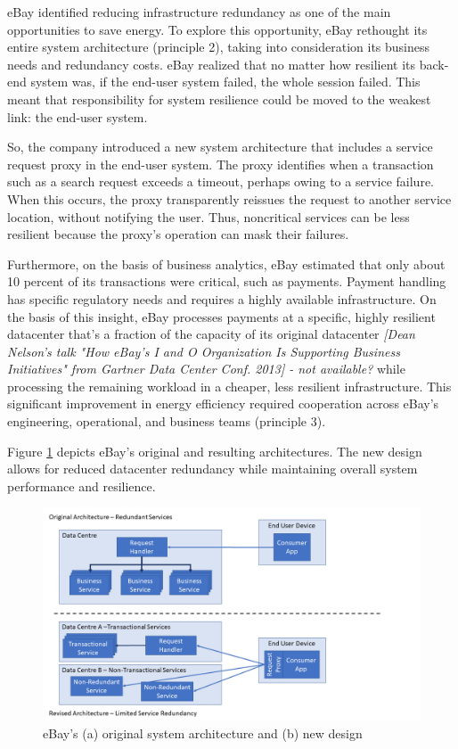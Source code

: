 eBay identified reducing infrastructure redundancy as one of the main opportunities to save energy. To explore this opportunity, eBay rethought its entire system architecture (principle 2), taking into consideration its business needs and redundancy costs. eBay realized that no matter how resilient its back-end system was, if the end-user system failed, the whole session failed. This meant that responsibility for system resilience could be moved to the weakest link: the end-user system.

So, the company introduced a new system architecture that includes a service request proxy in the end-user system. The proxy identifies when a transaction such as a search request exceeds a timeout, perhaps owing to a service failure. When this occurs, the proxy transparently reissues the request to another service location, without notifying the user. Thus, noncritical services can be less resilient because the proxy's operation can mask their failures.

Furthermore, on the basis of business analytics, eBay estimated that only about 10 percent of its transactions were critical, such as payments. Payment handling has specific regulatory needs and requires a highly available infrastructure. On the basis of this insight, eBay processes payments at a specific, highly resilient datacenter that's a fraction of the capacity of its original datacenter \emph{[Dean Nelson's talk "How eBay's I and O Organization Is Supporting Business Initiatives" from Gartner Data Center Conf. 2013] - not available?} while processing the remaining workload in a cheaper, less resilient infrastructure. This significant improvement in energy efficiency required cooperation across eBay's engineering, operational, and business teams (principle 3).

Figure \ref{figure:styles} depicts eBay's original and resulting architectures. The new design allows for reduced datacenter redundancy while maintaining overall system performance and resilience.

\begin{figure}
\centering
\includegraphics[width=\textwidth]{Figures/principles-styles}
\caption{eBay's (a) original system architecture and (b) new design}
\label{figure:styles}
\end{figure}

